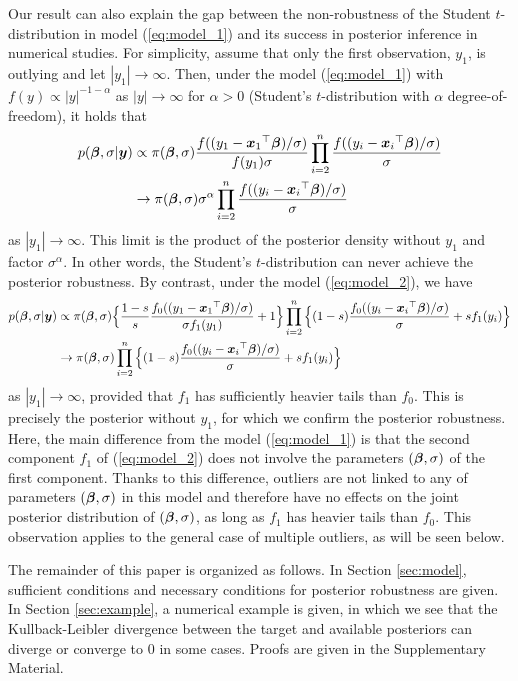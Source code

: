 \documentclass[12pt]{article}
\def\si{{\sigma}}
\def\al{{\alpha}}
\def\si{{\sigma}}
\def\non{{\nonumber}}
\def\al{{\alpha}}
\def\si{{\sigma}}
\def\bbe{{\text{\boldmath $\beta$}}}
\def\x{{\text{\boldmath $x$}}}
\def\y{{\text{\boldmath $y$}}}
\def\non{{\nonumber}}
\begin{document}
Our result can also explain the gap between the non-robustness of the Student $t$-distribution in model (\ref{eq:model_1}) and its success in posterior inference in numerical studies. 
%
For simplicity, assume that only the first observation, $y_1$, is outlying and let $|y_1|\to \infty$. 
Then, under the model (\ref{eq:model_1}) with $f(y) \propto |y|^{- 1 - \al }$ as $|y| \to \infty $ for $\al > 0$ (Student's $t$-distribution with $\al$ degree-of-freedom), it holds that 
\begin{align}
p( \bbe , \si | \y ) &\propto \pi ( \bbe , \si ) {f(( y_1 - {\x _1}^{\top } \bbe ) / \si ) \over f( y_1 ) \si } \prod_{i = 2}^{n} {f(( y_i - {\x _i}^{\top } \bbe ) / \si ) \over \si } \non \\
&\to \pi ( \bbe , \si ) \si ^{\al } \prod_{i = 2}^{n} {f(( y_i - {\x _i}^{\top } \bbe ) / \si ) \over \si } \non 
\end{align}
as $| y_1 | \to \infty $. This limit is the product of the posterior density without $y_1$ and factor $\si^{\al}$. In other words, the Student's $t$-distribution can never achieve the posterior robustness. %
By contrast, under the model (\ref{eq:model_2}), we have 
\begin{align}
p( \bbe , \si | \y ) &\propto \pi ( \bbe , \si ) \Big\{ {1 - s \over s} {f_0 (( y_1 - {\x _1}^{\top } \bbe ) / \si ) \over \si f_1 ( y_1 )} + 1 \Big\} \prod_{i = 2}^{n} \Big\{ (1 - s) {f_0 (( y_i - {\x _i}^{\top } \bbe ) / \si ) \over \si } + s f_1 ( y_i ) \Big\} \non \\
&\to \pi ( \bbe , \si ) \prod_{i = 2}^{n} \Big\{ (1 - s) {f_0 (( y_i - {\x _i}^{\top } \bbe ) / \si ) \over \si } + s f_1 ( y_i ) \Big\} \non 
\end{align}
as $| y_1 | \to \infty $, provided that $f_1$ has sufficiently heavier tails than $f_0$. 
This is precisely the posterior without $y_1$, for which we confirm the posterior robustness. 
%
Here, the main difference from the model (\ref{eq:model_1}) is that the second component $f_1$ of (\ref{eq:model_2}) does not involve the parameters $(\bbe, \sigma)$ of the first component. 
%
Thanks to this difference, outliers are not linked to any of parameters $(\bbe , \si)$ in this model and therefore have no effects on the joint posterior distribution of $(\bbe , \si)$, as long as $f_1$ has heavier tails than $f_0$. 
This observation applies to the general case of multiple outliers, as will be seen below. 






The remainder of this paper is organized as follows. 
In Section \ref{sec:model}, sufficient conditions and necessary conditions for posterior robustness are given. 
In Section \ref{sec:example}, a numerical example is given, in which we see that the Kullback-Leibler divergence between the target and available posteriors can diverge or converge to $0$ in some cases. 
Proofs are given in the Supplementary Material. 
\end{document}
